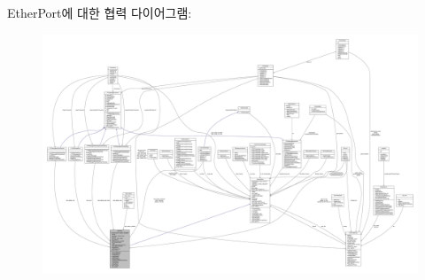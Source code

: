 Ether\+Port에 대한 협력 다이어그램\+:
\nopagebreak
\begin{figure}[H]
\begin{center}
\leavevmode
\includegraphics[width=350pt]{class_ether_port__coll__graph}
\end{center}
\end{figure}
